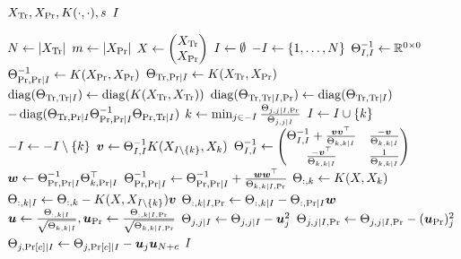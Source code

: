 \begin{algorithmic}[1]
  \REQUIRE \( X_{\text{Tr}}, X_{\text{Pr}}, K(\cdot, \cdot), s \)
  \ENSURE \( I \)

  \STATE \( N \gets \lvert X_{\text{Tr}}\rvert \)
  \STATE \( m \gets \lvert X_{\text{Pr}}\rvert \)
  \STATE \(
    X \gets
    \begin{pmatrix}
      X_{\text{Tr}} \\
      X_{\text{Pr}}
    \end{pmatrix}
  \)
  \STATE \( I \gets \emptyset \)
  \STATE \( -I \gets \{ 1, \dotsc, N \} \)
  \STATE \( \Theta_{I, I}^{-1} \gets \mathbb{R}^{0 \times 0} \)
  \STATE \(
    \Theta_{\text{Pr}, \text{Pr} \mid I}^{-1} \gets
    K(X_{\text{Pr}}, X_{\text{Pr}})
  \)
  \STATE \(
    \Theta_{\text{Tr}, \text{Pr} \mid I} \gets
    K(X_{\text{Tr}}, X_{\text{Pr}})
  \)
  \STATE \(
    \operatorname{diag}(\Theta_{\text{Tr}, \text{Tr} \mid I}) \gets
    \operatorname{diag}(K(X_{\text{Tr}}, X_{\text{Tr}}))
  \)
  \STATE \(
    \operatorname{diag}(\Theta_{\text{Tr}, \text{Tr} \mid I, \text{Pr}}) \gets
    \operatorname{diag}(\Theta_{\text{Tr}, \text{Tr} \mid I})
  \) \\  \(
    - \operatorname{diag}(
      \Theta_{\text{Tr}, \text{Pr} \mid I}
      \Theta_{\text{Pr}, \text{Pr} \mid I}^{-1}
      \Theta_{\text{Pr}, \text{Tr} \mid I}
    )
  \)
    \STATE \(
      k \gets \min_{j \in -I}
      \frac{\Theta_{j, j \mid I, \text{Pr}}}{\Theta_{j, j \mid I}}
    \)
    \STATE \( I \gets I \cup \{ k \} \)
    \STATE \( -I \gets -I \setminus \{ k \} \)
    \STATE \( \bm{v} \gets \Theta_{I, I}^{-1}
      K(X_{I \setminus \{ k \}}, X_k) \)
    \STATE \(
      \Theta_{I, I}^{-1} \gets
      \begin{pmatrix}
        \Theta_{I, I}^{-1} +
        \frac{\bm{v} \bm{v}^{\top}}{\Theta_{k, k \mid I}} &
        \frac{-\bm{v}}{\Theta_{k, k \mid I}} \\
        \frac{-\bm{v}^{\top}}{\Theta_{k, k \mid I}} &
        \frac{1}{\Theta_{k, k \mid I}}
      \end{pmatrix}
    \)
    \STATE \(
      \bm{w} \gets \Theta_{\text{Pr}, \text{Pr} \mid I}^{-1}
      \Theta_{k, \text{Pr} \mid I}^{\top}
    \)
    \STATE \(
      \Theta_{\text{Pr}, \text{Pr} \mid I}^{-1} \gets
      \Theta_{\text{Pr}, \text{Pr} \mid I}^{-1} +
      \frac{\bm{w} \bm{w}^{\top}}{\Theta_{k, k \mid I, \text{Pr}}}
    \)
    \STATE \( \Theta_{:, k} \gets K(X, X_k) \)
    \STATE \(
      \Theta_{:, k \mid I} \gets
      \Theta_{:, k} -
      K(X, X_{I \setminus \{ k \}}) \bm{v}
    \)
    \STATE \(
      \Theta_{:, k \mid I, \text{Pr}} \gets
      \Theta_{:, k \mid I} -
      \Theta_{:, \text{Pr} \mid I} \bm{w}
    \)
    \STATE \(
      \bm{u} \gets
      \frac{\Theta_{:, k \mid I}}{\sqrt{\Theta_{k, k \mid I}}},
      \bm{u}_{\text{Pr}} \gets
      \frac{\Theta_{:, k \mid I, \text{Pr}}}
            {\sqrt{\Theta_{k, k \mid I, \text{Pr}}}}
    \)
      \STATE \(
        \Theta_{j, j \mid I} \gets
        \Theta_{j, j \mid I} -
        \bm{u}_j^2
      \)
      \STATE \(
        \Theta_{j, j \mid I, \text{Pr}} \gets
        \Theta_{j, j \mid I, \text{Pr}} -
        (\bm{u}_{\text{Pr}})_j^2
      \)
        \STATE \(
          \Theta_{j, \text{Pr}[c] \mid I} \gets
          \Theta_{j, \text{Pr}[c] \mid I} -
          \bm{u}_j \bm{u}_{N + c}
        \)
      \ENDFOR
    \ENDFOR
  \ENDWHILE
  \RETURN \( I \)
\end{algorithmic}
